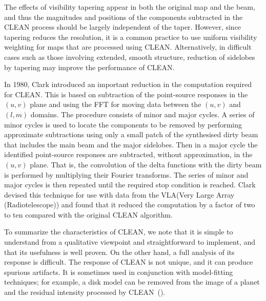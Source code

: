 The effects of visibility tapering appear in both the original map and the beam, and thus the magnitudes and positions of the components subtracted in the CLEAN process should be largely independent of the taper. However, since tapering reduces the resolution, it is a common practice to use uniform visibility weighting for maps that are processed using CLEAN. Alternatively, in difficult cases such as those involving extended, smooth structure, reduction of sidelobes by tapering may improve the performance of CLEAN.

In 1980, Clark introduced an important reduction in the computation required for CLEAN. This is based on subtraction of the point-source responses in the $(u ,v)$ plane and using the FFT for moving data between the $(u,v)$ and $(l, m)$ domains. The procedure consists of minor and major cycles. A series of minor cycles is used to locate the components to be removed by performing approximate subtractions using only a small patch of the synthesised dirty beam that includes the main beam and the major sidelobes. Then in a major cycle the identified point-source responses are subtracted, without approximation, in the $(u, v)$ plane. That is, the convolution of the delta functions with the dirty beam is performed by multiplying their Fourier transforms. The series of minor and major cycles is then repeated until the required stop condition is reached. Clark devised this technique for use with data from the VLA(Very Large Array (Radiotelescope)) and found that it reduced the computation by a factor of two to ten compared with the original CLEAN algorithm.

To summarize the characteristics of CLEAN, we note that it is simple to understand from a qualitative viewpoint and straightforward to implement, and that its usefulness is well proven. On the other hand, a full analysis of its response is difficult. The response of CLEAN is not unique, and it can produce spurious artifacts. It is sometimes used in conjunction with model-fitting techniques; for example, a disk model can be removed from the image of a planet and the residual intensity processed by CLEAN~(\citet[Pg. 432]{thompson2008interferometry}).
